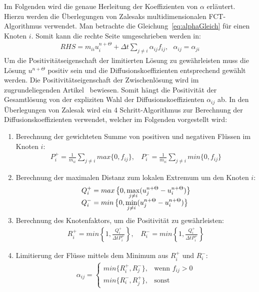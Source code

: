 \documentclass[12pt,titlepage]{article}
\begin{document}
Im Folgenden wird die genaue Herleitung der Koeffizienten von $\alpha$ erläutert. Hierzu werden die Überlegungen von Zalesaks multidimensionalen FCT-Algorithmus verwendet\cite{zalesak1979fully}. Man betrachte die Gleichung~\eqref{eq:alphaGleich} für einen Knoten $i$. Somit kann die rechte Seite umgeschrieben werden in:
\begin{align}
 RHS=m_{ii}u_i^{n+\Theta}+\Delta t\sum\limits_{j\neq i}\alpha_{ij}f_{ij},~~~\alpha_{ij}=\alpha_{ji}\nonumber
\end{align}
Um die Positivitätseigenschaft der limitierten Lösung zu gewährleisten muss die Lösung $u^{n+\Theta}$ positiv sein und die Diffusionskoeffizienten entsprechend gewählt werden. Die Positivitätseigenschaft der Zwischenlösung wird im zugrundeliegenden Artikel~\cite{kuzmin2002flux} bewiesen. Somit hängt die Positivität der Gesamtlösung von der expliziten Wahl der Diffusionskoeffizienten $\alpha_{ij}$ ab. In den Überlegungen von Zalesak wird ein 4 Schritt-Algorithmus zur Berechnung der Diffusionskoeffizienten verwendet, welcher im Folgenden vorgestellt wird:
\begin{enumerate}
 \item Berechnung der gewichteten Summe von positiven und negativen Flüssen im Knoten $i$:
\begin{align}
P_i^+=\frac{1}{m_{ii}}\sum\limits_{j\neq i}max\{0,f_{ij}\},~~~~P_i^-=\frac{1}{m_{ii}}\sum\limits_{j\neq i}min\{0,f_{ij}\}\nonumber
\end{align}
 \item Berechnung der maximalen Distanz zum lokalen Extremum um den Knoten $i$:
 \begin{align}
Q_i^+&=max\left\{0,\smash{\displaystyle\max_{j\neq i}}(u_j^{n+\Theta}-u_i^{n+\Theta})\right\}\nonumber\\
Q_i^-&=min\left\{0,\smash{\displaystyle\min_{j\neq i}}(u_j^{n+\Theta}-u_i^{n+\Theta})\right\}\nonumber
\end{align}
 \item Berechnung des Knotenfaktors, um die Positivität zu gewährleisten:
\begin{align}
R_i^+=min\left\{1,\frac{Q_i^+}{\Delta tP_i^+}\right\},~~~~R_i^-=min\left\{1,\frac{Q_i^+}{\Delta tP_i^+}\right\}\nonumber
\end{align}
 \item Limitierung der Flüsse mittels dem Minimum aus $R_i^+$ und $R_i^-$:
\begin{align}
\alpha_{ij}=   \begin{cases}
     min\{R_i^+,R_j^-\}, & \text{wenn } f_{ij}>0 \\
     min\{R_i^-,R_j^+\}, & \text{sonst} 
   \end{cases}\nonumber
\end{align}
\end{enumerate}
\end{document}
